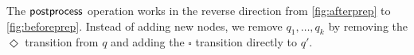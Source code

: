 The $\operatorname{\textsf{postprocess}}$ operation works in the reverse direction from \autoref{fig:afterprep} to \autoref{fig:beforeprep}. Instead of adding new nodes, we remove $q_{1},\dots,q_{k}$ by removing the $\Diamond$ transition from $q$ and adding the $\square$ transition directly to $q'$.






%
%
%
%
%







